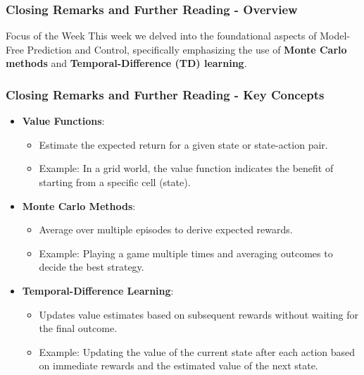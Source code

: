 \documentclass[aspectratio=169]{beamer}
\begin{document}
\begin{frame}[fragile]
  \frametitle{Closing Remarks and Further Reading - Overview}
  \begin{block}{Focus of the Week}
    This week we delved into the foundational aspects of Model-Free Prediction and Control, specifically emphasizing the use of \textbf{Monte Carlo methods} and \textbf{Temporal-Difference (TD) learning}.
  \end{block}
\end{frame}

\begin{frame}[fragile]
  \frametitle{Closing Remarks and Further Reading - Key Concepts}
  \begin{itemize}
    \item \textbf{Value Functions}:
      \begin{itemize}
        \item Estimate the expected return for a given state or state-action pair.
        \item Example: In a grid world, the value function indicates the benefit of starting from a specific cell (state).
      \end{itemize}
    
    \item \textbf{Monte Carlo Methods}:
      \begin{itemize}
        \item Average over multiple episodes to derive expected rewards.
        \item Example: Playing a game multiple times and averaging outcomes to decide the best strategy.
      \end{itemize}
  
    \item \textbf{Temporal-Difference Learning}:
      \begin{itemize}
        \item Updates value estimates based on subsequent rewards without waiting for the final outcome.
        \item Example: Updating the value of the current state after each action based on immediate rewards and the estimated value of the next state.
      \end{itemize}
  \end{itemize}
\end{frame}
\end{document}
